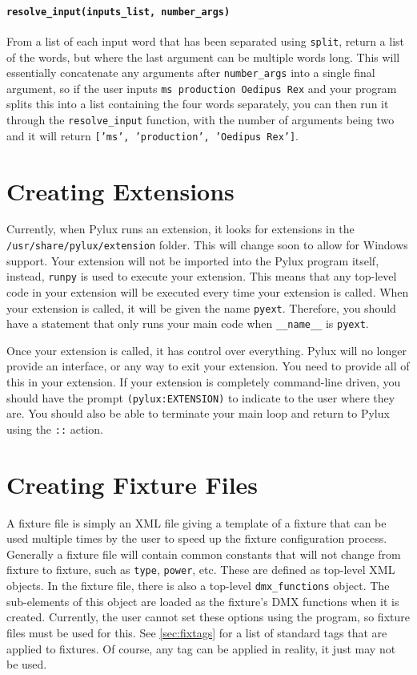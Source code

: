\documentclass[a4paper]{article}
\begin{document}
\paragraph{\texttt{resolve\_input(inputs\_list, number\_args)}}
From a list of each input word that has been separated using \texttt{split}, 
return a list of the words, but where the last argument can be multiple words 
long. This will essentially concatenate any arguments after 
\texttt{number\_args} into a single final argument, so if the user inputs 
\texttt{ms production Oedipus Rex} and your program splits this into a list 
containing the four words separately, you can then run it through the 
\texttt{resolve\_input} function, with the number of arguments being two and 
it will return \texttt{['ms', 'production', 'Oedipus Rex']}.

\section{Creating Extensions}
Currently, when Pylux runs an extension, it looks for extensions in the 
\texttt{/usr/share/pylux/extension} folder. This will change soon to allow for 
Windows support. Your extension will not be imported into the Pylux program 
itself, instead, \texttt{runpy} is used to execute your extension. This means 
that any top-level code in your extension will be executed every time your 
extension is called. When your extension is called, it will be given the 
name \texttt{pyext}. Therefore, you should have a statement that only runs 
your main code when \texttt{\_\_name\_\_} is \texttt{pyext}.

Once your extension is called, it has control over everything. Pylux will no 
longer provide an interface, or any way to exit your extension. You need to 
provide all of this in your extension. If your extension is completely 
command-line driven, you should have the prompt \texttt{(pylux:EXTENSION)} to 
indicate to the user where they are. You should also be able to terminate 
your main loop and return to Pylux using the \texttt{::} action.

\section{Creating Fixture Files}
A fixture file is simply an XML file giving a template of a fixture that can 
be used multiple times by the user to speed up the fixture configuration 
process. Generally a fixture file will contain common constants that will not 
change from fixture to fixture, such as \texttt{type}, \texttt{power}, etc. 
These are defined as top-level XML objects. In the fixture file, there is also 
a top-level \texttt{dmx\_functions} object. The sub-elements of this object 
are loaded as the fixture's DMX functions when it is created. Currently, the 
user cannot set these options using the program, so fixture files must be 
used for this. See \autoref{sec:fixtags} for a list of standard tags that 
are applied to fixtures. Of course, any tag can be applied in reality, it 
just may not be used.
\end{document}
